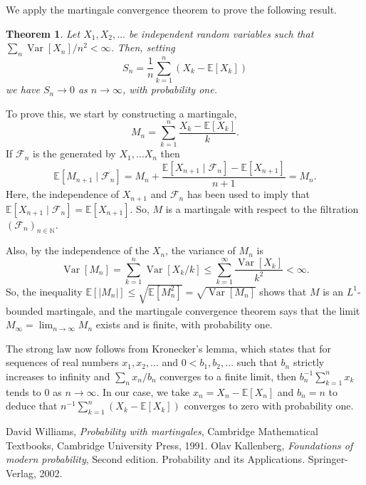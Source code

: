 \documentclass[12pt]{article}
\newtheorem*{theorem*}{Theorem}
\begin{document}
We apply the martingale convergence theorem to prove the following result.

\begin{theorem*}
Let $X_1,X_2,\ldots$ be independent random variables such that $\sum_n \operatorname{Var}[X_n]/n^2<\infty$. Then, setting
\begin{equation*}
S_n=\frac{1}{n}\sum_{k=1}^n(X_k-\mathbb{E}[X_k])
\end{equation*}
we have $S_n\rightarrow 0$ as $n\rightarrow\infty$, with probability one.
\end{theorem*}

To prove this, we start by constructing a martingale,
\begin{equation*}
M_n=\sum_{k=1}^n\frac{X_k-\mathbb{E}[X_k]}{k}.
\end{equation*}
If $\mathcal{F}_n$ is the  generated by $X_1,\ldots X_n$ then
\begin{equation*}
\mathbb{E}[M_{n+1}\mid\mathcal{F}_n]=M_n+\frac{\mathbb{E}[X_{n+1}\mid\mathcal{F}_n]-\mathbb{E}[X_{n+1}]}{n+1}=M_n.
\end{equation*}
Here, the independence of $X_{n+1}$ and $\mathcal{F}_n$ has been used to imply that $\mathbb{E}[X_{n+1}\mid\mathcal{F}_n]=\mathbb{E}[X_{n+1}]$. So, $M$ is a martingale with respect to the filtration $(\mathcal{F}_n)_{n\in\mathbb{N}}$.

Also, by the independence of the $X_n$, the variance of $M_n$ is
\begin{equation*}
\operatorname{Var}[M_n]=\sum_{k=1}^n\operatorname{Var}[X_k/k]\le\sum_{k=1}^\infty\frac{\operatorname{Var}[X_k]}{k^2}<\infty.
\end{equation*}
So, the inequality $\mathbb{E}[|M_n|]\le\sqrt{\mathbb{E}[M_n^2]}=\sqrt{\operatorname{Var}[M_n]}$ shows that $M$ is an $L^1$-bounded martingale, and the martingale convergence theorem says that the limit $M_\infty=\lim_{n\rightarrow\infty}M_n$ exists and is finite, with probability one.

The strong law now follows from Kronecker's lemma, which states that for sequences of real numbers $x_1,x_2,\ldots$ and $0<b_1,b_2,\ldots$ such that $b_n$ strictly increases to infinity and $\sum_nx_n/b_n$ converges to a finite limit, then $b_n^{-1}\sum_{k=1}^nx_k$ tends to $0$ as $n\rightarrow\infty$. In our case, we take $x_n=X_n-\mathbb{E}[X_n]$ and $b_n=n$ to deduce that $n^{-1}\sum_{k=1}^n(X_k-\mathbb{E}[X_k])$ converges to zero with probability one.

\begin{thebibliography}{9}
David Williams, \emph{Probability with martingales},
Cambridge Mathematical Textbooks, Cambridge University Press, 1991.
Olav Kallenberg, \emph{Foundations of modern probability}, Second edition. Probability and its Applications. Springer-Verlag, 2002.
\end{thebibliography}

\end{document}
